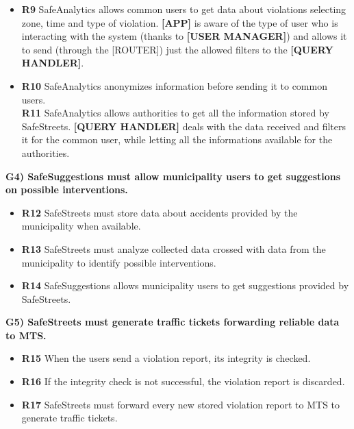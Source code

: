 \documentclass[a4paper]{article}
\begin{document}

\begin{itemize}
\item
  \textbf{R9} SafeAnalytics allows common users to get data about
  violations selecting zone, time and type of violation.
  \subitem	
	\textbf{[APP]} is aware of the type of user who is interacting with the system (thanks to \textbf{[USER MANAGER]}) and allows it to send (through the [ROUTER]) just the allowed filters to the \textbf{[QUERY HANDLER]}.
  
\item
  \textbf{R10} SafeAnalytics anonymizes information before sending it to
  common users.\\
  \textbf{R11} SafeAnalytics allows authorities to get all the information
  stored by SafeStreets.
  \subitem
    \textbf{[QUERY HANDLER]} deals with the data received and filters it for the common user, while letting all the informations available for the authorities.

\end{itemize}


\textbf{G4) SafeSuggestions must allow municipality users to get
suggestions on possible interventions.}

\begin{itemize}
\item
  \textbf{R12} SafeStreets must store data about accidents provided by
  the municipality when available.
\item
  \textbf{R13} SafeStreets must analyze collected data crossed with data
  from the municipality to identify possible interventions.
\item
  \textbf{R14} SafeSuggestions allows municipality users to get
  suggestions provided by SafeStreets.
\end{itemize}

\textbf{G5) SafeStreets must generate traffic tickets forwarding
reliable data to MTS.}

\begin{itemize}
\item
  \textbf{R15} When the users send a violation report, its integrity is
  checked.
\item
  \textbf{R16} If the integrity check is not successful, the violation
  report is discarded.
\item
  \textbf{R17} SafeStreets must forward every new stored violation
  report to MTS to generate traffic tickets.
\end{itemize}
\end{document}
